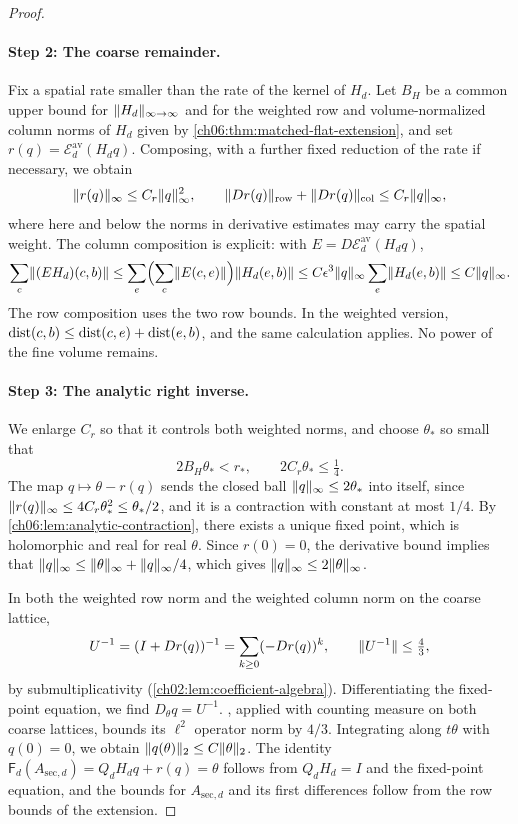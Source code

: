 \begin{proof}
\paragraph{Step 2: The coarse remainder.}
Fix a spatial rate smaller than the rate of the kernel of $H_d$. Let $B_H$ be a common upper bound for $\lVert H_d\rVert_{\infty\to\infty}$ and for the weighted row and volume-normalized column norms of $H_d$ given by \cref{ch06:thm:matched-flat-extension}, and set $r(q)=\mathscr E_d^{\mathrm{av}}(H_dq)$. Composing, with a further fixed reduction of the rate if necessary, we obtain
\begin{equation}\label{ch06:eq:coarse-remainder}
 \lVert r(q)\rVert_\infty\le C_r\lVert q\rVert_\infty^2,\qquad\lVert Dr(q)\rVert_{\mathrm{row}}+\lVert Dr(q)\rVert_{\mathrm{col}}\le C_r\lVert q\rVert_\infty,
\end{equation}
where here and below the norms in derivative estimates may carry the spatial weight. The column composition is explicit: with $E=D\mathscr E_d^{\mathrm{av}}(H_dq)$,
\[
 \sum_c\lVert (EH_d)(c,b)\rVert\le\sum_e\Bigl(\sum_c\lVert E(c,e)\rVert\Bigr)\lVert H_d(e,b)\rVert\le C\epsilon^3\lVert q\rVert_\infty\sum_e\lVert H_d(e,b)\rVert\le C\lVert q\rVert_\infty.
\]
The row composition uses the two row bounds. In the weighted version, $\operatorname{dist}(c,b)\le\operatorname{dist}(c,e)+\operatorname{dist}(e,b)$, and the same calculation applies. No power of the fine volume remains.

\paragraph{Step 3: The analytic right inverse.}
We enlarge $C_r$ so that it controls both weighted norms, and choose $\theta_*$ so small that
\[
 2B_H\theta_*<r_*,\qquad2C_r\theta_*\le\tfrac14.
\]
The map $q\mapsto\theta-r(q)$ sends the closed ball $\lVert q\rVert_\infty\le2\theta_*$ into itself, since $\lVert r(q)\rVert_\infty\le4C_r\theta_*^2\le\theta_*/2$, and it is a contraction with constant at most $1/4$. By \cref{ch06:lem:analytic-contraction}, there exists a unique fixed point, which is holomorphic and real for real $\theta$. Since $r(0)=0$, the derivative bound implies that $\lVert q\rVert_\infty\le\lVert \theta\rVert_\infty+\lVert q\rVert_\infty/4$, which gives $\lVert q\rVert_\infty\le2\lVert \theta\rVert_\infty$.

In both the weighted row norm and the weighted column norm on the coarse lattice,
\[
 U^{-1}=(I+Dr(q))^{-1}=\sum_{k\ge0}(-Dr(q))^k,\qquad\lVert U^{-1}\rVert\le\tfrac43,
\]
by submultiplicativity (\cref{ch02:lem:coefficient-algebra}). Differentiating the fixed-point equation, we find $D_\theta q=U^{-1}$. , applied with counting measure on both coarse lattices, bounds its $\ell^2$ operator norm by $4/3$. Integrating along $t\theta$ with $q(0)=0$, we obtain $\lVert q(\theta)\rVert_2\le C\lVert \theta\rVert_2$. The identity $\mathsf F_d(A_{\mathrm{sec},d})=Q_dH_dq+r(q)=\theta$ follows from $Q_dH_d=I$ and the fixed-point equation, and the bounds for $A_{\mathrm{sec},d}$ and its first differences follow from the row bounds of the extension.


\end{proof}

